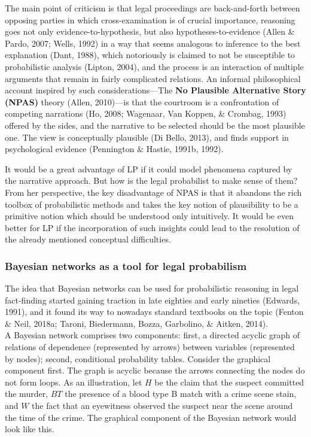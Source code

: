 \documentclass[11pt,dvipsnames,enabledeprecatedfontcommands]{scrartcl}
\begin{document}
The main point of criticism is that legal proceedings are back-and-forth
between opposing parties in which cross-examination is of crucial
importance, reasoning goes not only evidence-to-hypothesis, but also
hypotheses-to-evidence (Allen \& Pardo, 2007; Wells, 1992) in a way that
seems analogous to inference to the best explanation (Dant, 1988), which
notoriously is claimed to not be susceptible to probabilistic analysis
(Lipton, 2004), and the process is an interaction of multiple arguments
that remain in fairly complicated relations. An informal philosophical
account inspired by such considerations---The
\textbf{No Plausible Alternative Story (NPAS)} theory (Allen, 2010)---is
that the courtroom is a confrontation of competing narrations (Ho, 2008;
Wagenaar, Van Koppen, \& Crombag, 1993) offered by the sides, and the
narrative to be selected should be the most plausible one. The view is
conceptually plausible (Di Bello, 2013), and finds support in
psychological evidence (Pennington \& Hastie, 1991b, 1992).

It would be a great advantage of LP if it could model phenomena captured
by the narrative approach. But how is the legal probabilist to make
sense of them? From her perspective, the key disadvantage of NPAS is
that it abandons the rich toolbox of probabilistic methods and takes the
key notion of plausibility to be a primitive notion which should be
understood only intuitively. It would be even better for LP if the
incorporation of such insights could lead to the resolution of the
already mentioned conceptual difficulties.

\subsubsection{Bayesian networks as a tool for legal
probabilism}\label{bayesian-networks-as-a-tool-for-legal-probabilism}

The idea that Bayesian networks can be used for probabilistic reasoning
in legal fact-finding started gaining traction in late eighties and
early nineties (Edwards, 1991), and it found its way to nowadays
standard textbooks on the topic (Fenton \& Neil, 2018a; Taroni,
Biedermann, Bozza, Garbolino, \& Aitken, 2014).\\
A Bayesian network comprises two components: first, a directed acyclic
graph of relations of dependence (represented by arrows) between
variables (represented by nodes); second, conditional probability
tables. Consider the graphical component first. The graph is acyclic
because the arrows connecting the nodes do not form loops. As an
illustration, let \(H\) be the claim that the suspect committed the
murder, \(BT\) the presence of a blood type B match with a crime scene
stain, and \(W\) the fact that an eyewitness observed the suspect near
the scene around the time of the crime. The graphical component of the
Bayesian network would look like this.
\end{document}
